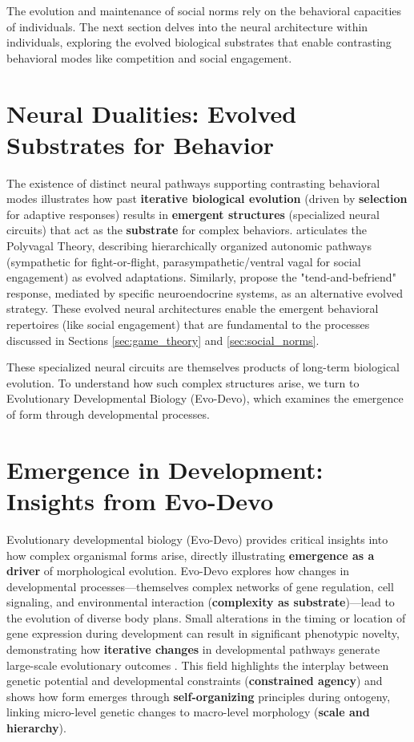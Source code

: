 \documentclass[12pt,openany]{book}
\begin{document}
The evolution and maintenance of social norms rely on the behavioral capacities of individuals. The next section delves into the neural architecture within individuals, exploring the evolved biological substrates that enable contrasting behavioral modes like competition and social engagement.

\section{Neural Dualities: Evolved Substrates for Behavior} \label{sec:neural}
The existence of distinct neural pathways supporting contrasting behavioral modes illustrates how past \textbf{iterative biological evolution} (driven by \textbf{selection} for adaptive responses) results in \textbf{emergent structures} (specialized neural circuits) that act as the \textbf{substrate} for complex behaviors. \citet{porges2009polyvagal} articulates the Polyvagal Theory, describing hierarchically organized autonomic pathways (sympathetic for fight-or-flight, parasympathetic/ventral vagal for social engagement) as evolved adaptations. Similarly, \citet{taylor2000biobehavioral} propose the "tend-and-befriend" response, mediated by specific neuroendocrine systems, as an alternative evolved strategy. These evolved neural architectures enable the emergent behavioral repertoires (like social engagement) that are fundamental to the processes discussed in Sections \ref{sec:game_theory} and \ref{sec:social_norms}.

These specialized neural circuits are themselves products of long-term biological evolution. To understand how such complex structures arise, we turn to Evolutionary Developmental Biology (Evo-Devo), which examines the emergence of form through developmental processes.

\section{Emergence in Development: Insights from Evo-Devo} \label{sec:evodevo}
Evolutionary developmental biology (Evo-Devo) provides critical insights into how complex organismal forms arise, directly illustrating \textbf{emergence as a driver} of morphological evolution. Evo-Devo explores how changes in developmental processes—themselves complex networks of gene regulation, cell signaling, and environmental interaction (\textbf{complexity as substrate})—lead to the evolution of diverse body plans. Small alterations in the timing or location of gene expression during development can result in significant phenotypic novelty, demonstrating how \textbf{iterative changes} in developmental pathways generate large-scale evolutionary outcomes \citep{EvoDevoSource}. This field highlights the interplay between genetic potential and developmental constraints (\textbf{constrained agency}) and shows how form emerges through \textbf{self-organizing} principles during ontogeny, linking micro-level genetic changes to macro-level morphology (\textbf{scale and hierarchy}).
\end{document}
